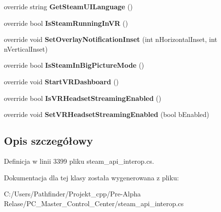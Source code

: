 \begin{DoxyCompactItemize}
override string {\bfseries Get\+Steam\+U\+I\+Language} ()
\item 
\mbox{\label{class_valve_1_1_steamworks_1_1_c_steam_utils_a4b6487a9e80419629d25a6e880ebec4e}} 
override bool {\bfseries Is\+Steam\+Running\+In\+VR} ()
\item 
\mbox{\label{class_valve_1_1_steamworks_1_1_c_steam_utils_a67252ee53ad15ac69ad89dafbe1b7a2d}} 
override void {\bfseries Set\+Overlay\+Notification\+Inset} (int n\+Horizontal\+Inset, int n\+Vertical\+Inset)
\item 
\mbox{\label{class_valve_1_1_steamworks_1_1_c_steam_utils_a2ffb0ac07ecd9d5895d28a2d5be38b33}} 
override bool {\bfseries Is\+Steam\+In\+Big\+Picture\+Mode} ()
\item 
\mbox{\label{class_valve_1_1_steamworks_1_1_c_steam_utils_a6a3e07f9a461e0c09a098871eba3b0de}} 
override void {\bfseries Start\+V\+R\+Dashboard} ()
\item 
\mbox{\label{class_valve_1_1_steamworks_1_1_c_steam_utils_ae0b3c558161725008fc31051c9781479}} 
override bool {\bfseries Is\+V\+R\+Headset\+Streaming\+Enabled} ()
\item 
\mbox{\label{class_valve_1_1_steamworks_1_1_c_steam_utils_a0acaaa874abe4d9eca3f048ef9e42751}} 
override void {\bfseries Set\+V\+R\+Headset\+Streaming\+Enabled} (bool b\+Enabled)
\end{DoxyCompactItemize}


\subsection{Opis szczegółowy}


Definicja w linii 3399 pliku steam\+\_\+api\+\_\+interop.\+cs.



Dokumentacja dla tej klasy została wygenerowana z pliku\+:\begin{DoxyCompactItemize}
\item 
C\+:/\+Users/\+Pathfinder/\+Projekt\+\_\+cpp/\+Pre-\/\+Alpha Relase/\+P\+C\+\_\+\+Master\+\_\+\+Control\+\_\+\+Center/steam\+\_\+api\+\_\+interop.\+cs\end{DoxyCompactItemize}
